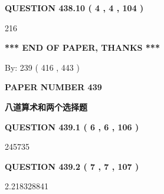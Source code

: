 \documentclass{ctexart}
\begin{document}
{\textbf{\Large{QUESTION
438.10 
 ( 4 , 4 , 104 )
}}}
  
  
 
 
\noindent{}

216
 
 
   
   
 \vspace{0.2in}
 
   
   
   
   
\vspace{1.0in} 
{\textbf{\large{ *** END OF PAPER, THANKS *** }}} 
   
   
\hspace{1.0in} By: 
 239 ( 416 ,  443 )
   
   
   
   
\newpage 
\setcounter{page}{ 
   439001 } 
   
   
   
   
 {\textbf{ \Large{ PAPER NUMBER  439  }}}
   
   
\vspace{0.2in}
   
   
   
   
   
   
 \vspace{0.2in}
{\LARGE {\textbf{ 八道算术和两个选择题}}}
   
   
  
\vspace{0.2in}
  
{\textbf{\Large{QUESTION
439.1 
 ( 6 , 6 , 106 )
}}}
  
  
 
 
\noindent{}

245735
 
 
  
\vspace{0.2in}
  
{\textbf{\Large{QUESTION
439.2 
 ( 7 , 7 , 107 )
}}}
  
  
 
 
\noindent{}

2.218328841
 
 
  
\vspace{0.2in}
  
\end{document}
